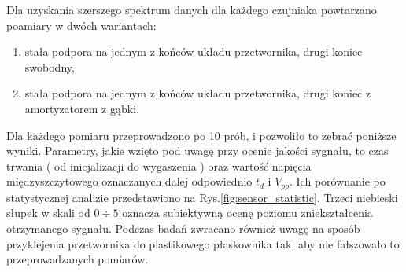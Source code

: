Dla uzyskania szerszego spektrum danych dla każdego czujniaka powtarzano poamiary w dwóch wariantach: 
\begin{enumerate}
\item stała podpora na jednym z końców układu przetwornika, drugi koniec swobodny,
\item stała podpora na jednym z końców układu przetwornika, drugi koniec z amortyzatorem z gąbki.
\end{enumerate}
Dla każdego pomiaru przeprowadzono po 10 prób, i pozwoliło to zebrać poniższe wyniki. Parametry, jakie wzięto pod uwagę przy ocenie jakości sygnału, to czas trwania ( od inicjalizacji do wygaszenia ) oraz wartość napięcia międzyszczytowego oznaczanych dalej odpowiednio $t_d$ i $V_{pp}$. Ich porównanie po statystycznej analizie przedstawiono na Rys.\ref{fig:sensor_statistic}. Trzeci niebieski słupek w skali od $0\div5$ oznacza subiektywną ocenę poziomu zniekształcenia otrzymanego sygnału. Podczas badań zwracano również uwagę na sposób przyklejenia przetwornika do plastikowego płaskownika tak, aby nie fałszowało to przeprowadzanych pomiarów. 



